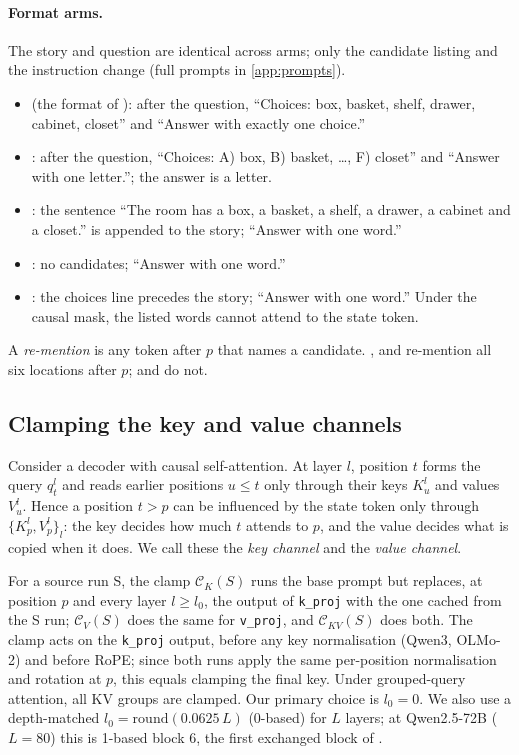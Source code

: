 \paragraph{Format arms.} The story and question are identical across arms; only the candidate listing and the instruction change (full prompts in \cref{app:prompts}).
\begin{itemize}\setlength\itemsep{1pt}
  \item \fmtOpt{} (the format of \citealt{anonymous2026fitted}): after the question, ``Choices: box, basket, shelf, drawer, cabinet, closet'' and ``Answer with exactly one choice.''
  \item \fmtLetter{}: after the question, ``Choices: A) box, B) basket, \dots, F) closet'' and ``Answer with one letter.''; the answer is a letter.
  \item \fmtPost{}: the sentence ``The room has a box, a basket, a shelf, a drawer, a cabinet and a closet.'' is appended to the story; ``Answer with one word.''
  \item \fmtNone{}: no candidates; ``Answer with one word.''
  \item \fmtBefore{}: the choices line precedes the story; ``Answer with one word.'' Under the causal mask, the listed words cannot attend to the state token.
\end{itemize}
A \emph{re-mention} is any token after $p$ that names a candidate. \fmtOpt{}, \fmtLetter{} and \fmtPost{} re-mention all six locations after $p$; \fmtNone{} and \fmtBefore{} do not.

\subsection{Clamping the key and value channels}\label{sec:method-clamp}

Consider a decoder with causal self-attention. At layer $l$, position $t$ forms the query $q_t^l$ and reads earlier positions $u \le t$ only through their keys $K_u^l$ and values $V_u^l$. Hence a position $t > p$ can be influenced by the state token only through $\{K_p^l, V_p^l\}_l$: the key decides how much $t$ attends to $p$, and the value decides what is copied when it does. We call these the \emph{key channel} and the \emph{value channel}.

For a source run S, the clamp $\mathcal{C}_K(S)$ runs the base prompt but replaces, at position $p$ and every layer $l \ge l_0$, the output of \texttt{k\_proj} with the one cached from the S run; $\mathcal{C}_V(S)$ does the same for \texttt{v\_proj}, and $\mathcal{C}_{KV}(S)$ does both. The clamp acts on the \texttt{k\_proj} output, before any key normalisation (Qwen3, OLMo-2) and before RoPE; since both runs apply the same per-position normalisation and rotation at $p$, this equals clamping the final key. Under grouped-query attention, all KV groups are clamped. Our primary choice is $l_0 = 0$. We also use a depth-matched $l_0 = \mathrm{round}(0.0625\,L)$ (0-based) for $L$ layers; at Qwen2.5-72B ($L = 80$) this is 1-based block 6, the first exchanged block of \citet{anonymous2026fitted}.


